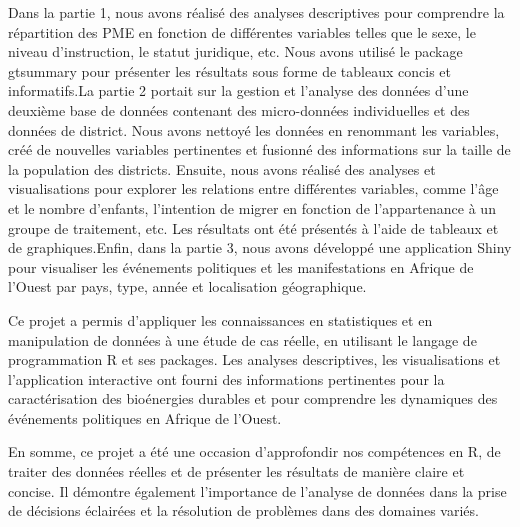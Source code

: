 \documentclass[
]{article}
\begin{document}
Dans la partie 1, nous avons réalisé des analyses descriptives pour
comprendre la répartition des PME en fonction de différentes variables
telles que le sexe, le niveau d'instruction, le statut juridique, etc.
Nous avons utilisé le package gtsummary pour présenter les résultats
sous forme de tableaux concis et informatifs.La partie 2 portait sur la
gestion et l'analyse des données d'une deuxième base de données
contenant des micro-données individuelles et des données de district.
Nous avons nettoyé les données en renommant les variables, créé de
nouvelles variables pertinentes et fusionné des informations sur la
taille de la population des districts. Ensuite, nous avons réalisé des
analyses et visualisations pour explorer les relations entre différentes
variables, comme l'âge et le nombre d'enfants, l'intention de migrer en
fonction de l'appartenance à un groupe de traitement, etc. Les résultats
ont été présentés à l'aide de tableaux et de graphiques.Enfin, dans la
partie 3, nous avons développé une application Shiny pour visualiser les
événements politiques et les manifestations en Afrique de l'Ouest par
pays, type, année et localisation géographique.

Ce projet a permis d'appliquer les connaissances en statistiques et en
manipulation de données à une étude de cas réelle, en utilisant le
langage de programmation R et ses packages. Les analyses descriptives,
les visualisations et l'application interactive ont fourni des
informations pertinentes pour la caractérisation des bioénergies
durables et pour comprendre les dynamiques des événements politiques en
Afrique de l'Ouest.

En somme, ce projet a été une occasion d'approfondir nos compétences en
R, de traiter des données réelles et de présenter les résultats de
manière claire et concise. Il démontre également l'importance de
l'analyse de données dans la prise de décisions éclairées et la
résolution de problèmes dans des domaines variés.
\end{document}
